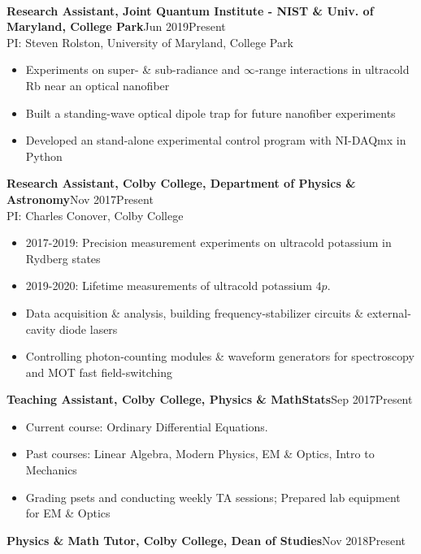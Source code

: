\documentclass[letter, 9pt]{article}
\newcommand{\longunderline}[1]{\uline{#1\hfill\mbox{}}}
\begin{document}
	\vspace{-7pt}
	\noindent \longunderline{\normalsize{{}}}
	\\ \vspace{-7pt}
	
	\noindent \textbf{Research Assistant, Joint Quantum Institute - NIST \& Univ. of Maryland, College Park}\hfill Jun 2019\textemdash Present\\ 
	\noindent PI: {Steven Rolston}, University of Maryland, College Park
	\begin{itemize}[noitemsep, nolistsep]
		\item Experiments on super- \& sub-radiance and $\infty$-range interactions in ultracold Rb near an optical nanofiber
		\item Built a standing-wave optical dipole trap for future nanofiber experiments
		\item Developed an stand-alone experimental control program with NI-DAQmx in Python
	\end{itemize}
	\textbf{Research Assistant, Colby College, Department of Physics \& Astronomy}\hfill Nov 2017\textemdash Present\\
	PI: {Charles Conover}, Colby College
	\begin{itemize}[noitemsep, nolistsep]
		\item 2017-2019: Precision measurement experiments on ultracold potassium in Rydberg states
		\item 2019-2020: Lifetime measurements of ultracold potassium $4p$.
		\item Data acquisition \& analysis, building frequency-stabilizer circuits \& external-cavity diode lasers
		\item Controlling photon-counting modules \& waveform generators for spectroscopy and MOT fast field-switching

	\end{itemize}	
 	\textbf{Teaching Assistant, Colby College, Physics \& MathStats}\hfill Sep  2017\textemdash Present 
	\begin{itemize}[noitemsep, nolistsep]
		\item Current course: Ordinary Differential Equations. 
		\item Past courses: Linear Algebra, Modern Physics, EM \& Optics, Intro to Mechanics
		\item Grading psets and conducting weekly TA sessions; Prepared lab equipment for EM \& Optics
	\end{itemize}
	\textbf{Physics \& Math Tutor, Colby College, Dean of Studies}\hfill Nov 2018\textemdash Present
\end{document}
